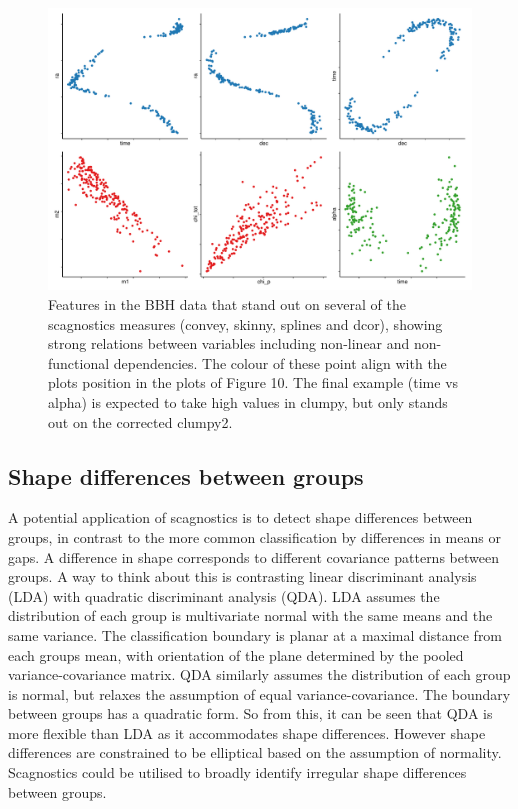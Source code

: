\begin{Schunk}
\begin{figure}
\includegraphics[width=1\linewidth]{mason-lee-laa-cook_files/figure-latex/blackholes-1} \caption[Features in the BBH data that stand out on several of the scagnostics measures (convey, skinny, splines and dcor), showing strong relations between variables including non-linear and non-functional dependencies]{Features in the BBH data that stand out on several of the scagnostics measures (convey, skinny, splines and dcor), showing strong relations between variables including non-linear and non-functional dependencies. The colour of these point align with the plots position in the plots of Figure 10. The final example (time vs alpha) is expected to take high values in clumpy, but only stands out on the corrected clumpy2.}\label{fig:blackholes}
\end{figure}
\end{Schunk}

\hypertarget{shape-differences-between-groups}{%
\subsection{Shape differences between
groups}\label{shape-differences-between-groups}}

A potential application of scagnostics is to detect shape differences
between groups, in contrast to the more common classification by
differences in means or gaps. A difference in shape corresponds to
different covariance patterns between groups. A way to think about this
is contrasting linear discriminant analysis (LDA) with quadratic
discriminant analysis (QDA). LDA assumes the distribution of each group
is multivariate normal with the same means and the same variance. The
classification boundary is planar at a maximal distance from each groups
mean, with orientation of the plane determined by the pooled
variance-covariance matrix. QDA similarly assumes the distribution of
each group is normal, but relaxes the assumption of equal
variance-covariance. The boundary between groups has a quadratic form.
So from this, it can be seen that QDA is more flexible than LDA as it
accommodates shape differences. However shape differences are
constrained to be elliptical based on the assumption of normality.
Scagnostics could be utilised to broadly identify irregular shape
differences between groups.

